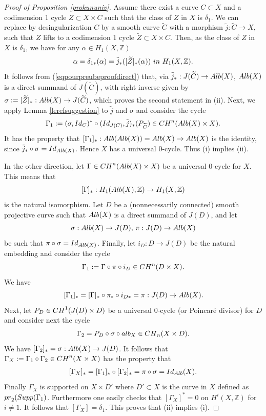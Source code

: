\documentclass[10pt,a4paper]{amsart}
\begin{document}
\begin{proof}[Proof of Proposition \ref{prokununiv}] Assume there exist a  curve $C\subset X$ and a codimension $1$ cycle $Z\subset X\times C$ such that the class of $Z$ in $X$ is $\delta_1$. We can replace by desingularization  $C$ by a smooth curve $\widetilde{C}$ with a morphism $\tilde{j}:\widetilde{C}\rightarrow X$, such that $Z$ lifts to a codimension $1$ cycle $\widetilde{Z}\subset X\times C$. Then, as the class of $Z$ in $X$ is $\delta_{1}$, we have for any $\alpha\in H_1(X,\mathbb{Z})$
\begin{eqnarray}\label{eqpourpreubeproofdirect} \alpha=\delta_{1*}(\alpha)=\tilde{j}_*([\widetilde{Z}]_*(\alpha))\,\,{\rm in}\,\,H_1(X,\mathbb{Z}).
\end{eqnarray}
It follows from (\ref{eqpourpreubeproofdirect}) that, via $\tilde{j}_*:J(\widetilde{C})\rightarrow {\rm Alb}(X)$, ${\rm Alb}(X)$ is a direct summand of $J(\widetilde{C})$, with right  inverse given by $ \sigma:=[\widetilde{Z}]_*:{\rm Alb}(X)\rightarrow J(\widetilde{C})$, which proves the second statement in (ii).
Next, we apply Lemma \ref{lerefsuggestion} to $\tilde{j}$ and $\sigma$ and consider
 the cycle
$$ \Gamma_1:= (\sigma,{\rm Id}_C)^*\circ({\rm Id}_{J(C)},\tilde{j})_*(P_{\widetilde{C}})\in {\rm CH}^n({\rm Alb}(X)\times X ).$$
It has the property that $[\Gamma_{1}]_*:{\rm Alb}({\rm Alb}(X))={\rm Alb}(X)\rightarrow {\rm Alb}(X)$ is the identity, since $\tilde{j}_*\circ \sigma={\rm Id}_{{\rm Alb}(X)}$. Hence $X$ has a universal $0$-cycle. Thus (i) implies (ii).




 In the other direction, let $\Gamma\in {\rm CH}^n( {\rm Alb}(X)\times X)$ be a universal $0$-cycle for $X$. This means that
$$[\Gamma]_*:H_1({\rm Alb}(X),\mathbb{Z})\rightarrow  H_1(X,\mathbb{Z})$$
is the natural isomorphism. Let $D$ be a (nonnecessarily connected) smooth projective  curve such that ${\rm Alb}(X)$   is a direct summand of $J(D)$, and let $$\sigma: {\rm Alb}(X)\rightarrow J(D),\,\pi:J(D)\rightarrow {\rm Alb}(X)$$ be such that $\pi\circ \sigma={\rm Id}_{{\rm Alb}(X)}$. Finally, let $i_D: D\rightarrow J(D)$ be the natural embedding and
consider the cycle
$$\Gamma_1:=    \Gamma\circ \pi\circ i_D\in{\rm CH}^n(D\times X).$$
We have $$[\Gamma_1]_*=[\Gamma]_*\circ \pi_*\circ i_{D*}=\pi: J(D)\rightarrow {\rm Alb}(X).$$
 Next, let $P_D\in {\rm CH}^1( J(D)\times D)$ be a universal $0$-cycle (or Poincar\'{e} divisor) for $D$ and consider next the cycle
$$\Gamma_2=P_D\circ \sigma \circ {\rm alb}_X\in {\rm CH}_n(X\times D).$$
We have
$[\Gamma_2]_*=\sigma:{\rm Alb}(X)\rightarrow J(D)$. It follows that
$\Gamma_X:=\Gamma_1\circ \Gamma_2\in {\rm CH}^n(X\times X)$
has the property that
\begin{eqnarray}\label{eqinversefacteur} [\Gamma_X]_*=[\Gamma_1]_*\circ [\Gamma_2]_*=\pi\circ \sigma={\rm Id}_{\rm Alb}(X).\end{eqnarray}
Finally $\Gamma_X$ is supported on $X\times D'$ where $D'\subset X$ is the curve in $X$ defined as ${\rm pr}_2({\rm Supp}(\Gamma_1)$. Furthermore one easily checks that $[\Gamma_X]^*=0$ on $H^i(X,\mathbb{Z})$ for $i\not =1$. It follows that $[\Gamma_X]=\delta_1$.
This proves that (ii) implies (i).


\end{proof}
\end{document}
